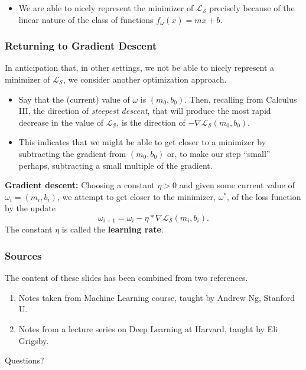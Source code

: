 \documentclass{beamer}
\theoremstyle{example}
\begin{document}
{\begin{frame}
    \pause 
    \begin{itemize}
        \item We are able to nicely represent the minimizer of $\mathcal L_{\mathcal S}$ precisely because of the linear nature of the class of functions $f_{\omega}(x) = mx+b$.
    \end{itemize}
\end{frame}

\begin{frame}
    \frametitle{Returning to Gradient Descent}
    In anticipation that, in other settings, we not be able to nicely represent a minimizer of $\mathcal L_{\mathcal S}$, we consider another optimization approach. 

    \pause
    \begin{itemize}
        \item Say that the (current) value of $\omega$ is $(m_0, b_0)$. Then, recalling from Calculus III, the direction of \textit{steepest descent}, that will produce the most rapid decrease in the value of $\mathcal L_{\mathcal S}$, is the direction of $-\nabla\mathcal L_{\mathcal S}(m_0,b_0)$.
        \item This indicates that we might be able to get closer to a minimizer by subtracting the gradient from $(m_0,b_0)$ or, to make our step ``small'' perhaps, subtracting a small multiple of the gradient.
    \end{itemize}

    \pause
    \textbf{Gradient descent:} Choosing a constant $\eta > 0$ and given some current value of $\omega_i = (m_i,b_i)$, we attempt to get closer to the minimizer, $\omega^*$, of the loss function by the update 
        \[\omega_{i+1} = \omega_i - \eta\ast\nabla\mathcal L_{\mathcal S}(m_i,b_i).\]
    The constant $\eta$ is called the \textbf{learning rate}.
\end{frame}

\begin{frame}
    \frametitle{Sources}
    The content of these slides has been combined from two references. 

    \begin{enumerate}
        \item Notes taken from Machine Learning course, taught by Andrew Ng, Stanford U.
        \item Notes from a lecture series on Deep Learning at Harvard, taught by Eli Grigsby.
    \end{enumerate}

    \vfill
\end{frame}
}

{
\begin{frame}[standout]
    Questions?
\end{frame}
}
\end{document}
